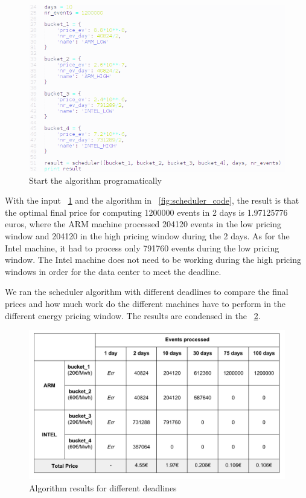\begin{figure}[h]
  \centering
    \includegraphics[width=150mm]{"img/scheduler_code_init2"}
    \caption{Start the algorithm programatically}
    \label{fig:scheduler_code_init}
\end{figure}

\vspace{10mm}

With the input ~\ref{fig:scheduler_code_init} and the algorithm in ~\ref{fig:scheduler_code}, the result is that the optimal final price for computing 1200000 events in 2 days is 1.97125776 euros, where the ARM machine processed 204120 events in the low pricing window and 204120 in the high pricing window during the 2 days. As for the Intel machine, it had to process only 791760 events during the low pricing window. The Intel machine does not need to be working during the high pricing windows in order for the data center to meet the deadline.

\vspace{10mm}


We ran the scheduler algorithm with different deadlines to compare the final prices and how much work do the different machines have to perform in the different energy pricing window. The results are condensed in the  ~\ref{fig:prices_final_table}.

\begin{figure}[h]
  \centering
    \includegraphics[width=150mm]{"img/prices_final_table"}
    \caption{Algorithm results for different deadlines}
    \label{fig:prices_final_table}
\end{figure}


